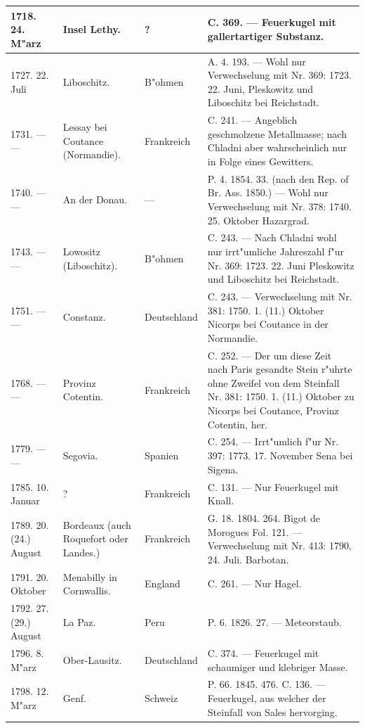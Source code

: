 \documentclass[a4paper, 8pt, oneside, polutonikogreek, german]{article}
\begin{document}
\begin{center}
\begin{longtable}{| p{20mm} | p{25mm} | p{20mm} | p{55mm} |}
        1718. 24. M"arz & Insel Lethy. & ? & C. 369. --- Feuerkugel mit gallertartiger Substanz. \\ \hline
        1727. 22. Juli & Liboschitz. & B"ohmen & A. 4. 193. --- Wohl nur Verwechselung mit Nr. 369: 1723. 22. Juni, Pleskowitz und Liboschitz bei Reichstadt. \\ \hline
        1731. --- --- & Lessay bei Coutance (Normandie). & Frankreich & C. 241. --- Angeblich geschmolzene Metallmasse; nach Chladni aber wahrscheinlich nur in Folge eines Gewitters. \\ \hline
        1740. --- --- & An der Donau. & --- & P. 4. 1854. 33. (nach den Rep. of Br. Ass. 1850.) --- Wohl nur Verwechselung mit Nr. 378: 1740. 25. Oktober Hazargrad. \\ \hline
        1743. --- --- & Lowositz (Liboschitz). & B"ohmen & C. 243. --- Nach Chladni wohl nur irrt"umliche Jahreszahl f"ur Nr. 369: 1723. 22. Juni Pleskowitz und Liboschitz bei Reichstadt. \\ \hline
        1751. --- --- & Constanz. & Deutschland & C. 243. --- Verwechselung mit Nr. 381: 1750. 1. (11.) Oktober Nicorps bei Coutance in der Normandie. \\ \hline
        1768. --- --- & Provinz Cotentin. & Frankreich & C. 252. --- Der um diese Zeit nach Paris gesandte Stein r"uhrte ohne Zweifel von dem Steinfall Nr. 381: 1750. 1. (11.) Oktober zu Nicorps bei Coutance, Provinz Cotentin, her. \\ \hline
        1779. --- --- & Segovia. & Spanien & C. 254. --- Irrt"umlich f"ur Nr. 397: 1773. 17. November Sena bei Sigena. \\ \hline
        1785. 10. Januar & ? & Frankreich & C. 131. --- Nur Feuerkugel mit Knall. \\ \hline
        1789. 20. (24.) August & Bordeaux (auch Roquefort oder Landes.) & Frankreich & G. 18. 1804. 264. Bigot de Morogues Fol. 121. --- Verwechselung mit Nr. 413: 1790, 24. Juli. Barbotan. \\ \hline
        1791. 20. Oktober & Menabilly in Cornwallis. & England & C. 261. --- Nur Hagel. \\ \hline
        1792. 27. (29.) August & La Paz. & Peru & P. 6. 1826. 27. --- Meteorstaub. \\ \hline
        1796. 8. M"arz & Ober-Lausitz. & Deutschland & C. 374. --- Feuerkugel mit schaumiger und klebriger Masse. \\ \hline
        1798. 12. M"arz & Genf. & Schweiz & P. 66. 1845. 476. C. 136. --- Feuerkugel, aus welcher der Steinfall von Sales hervorging. \\ \hline

\end{longtable}
\end{center}
\end{document}
